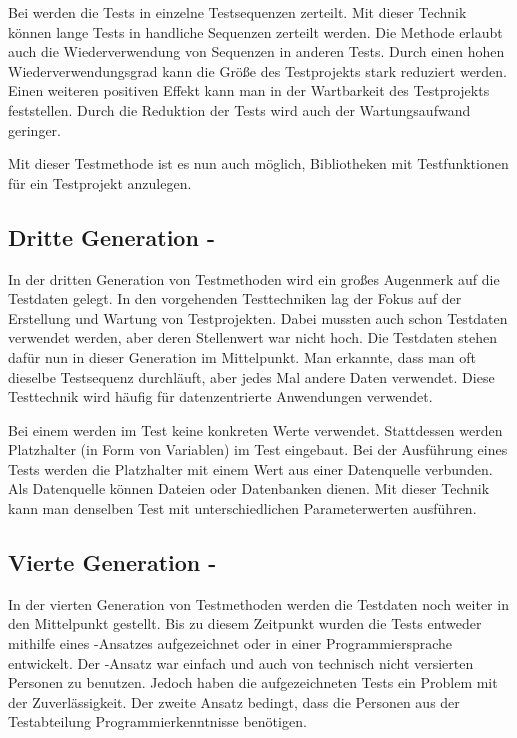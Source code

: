 Bei  werden die Tests in einzelne Testsequenzen zerteilt. Mit dieser Technik können lange Tests in handliche Sequenzen zerteilt werden. Die Methode erlaubt auch die Wiederverwendung von Sequenzen in anderen Tests. Durch einen hohen Wiederverwendungsgrad kann die Größe des Testprojekts stark reduziert werden. Einen weiteren positiven Effekt kann man in der Wartbarkeit des Testprojekts feststellen. Durch die Reduktion der Tests wird auch der Wartungsaufwand geringer.

\SuperPar
Mit dieser Testmethode ist es nun auch möglich, Bibliotheken mit Testfunktionen für ein Testprojekt anzulegen. 

\subsection{Dritte Generation - }

In der dritten Generation von Testmethoden wird ein großes Augenmerk auf die Testdaten gelegt. In den vorgehenden Testtechniken lag der Fokus auf der Erstellung und Wartung von Testprojekten. Dabei mussten auch schon Testdaten verwendet werden, aber deren Stellenwert war nicht hoch. Die Testdaten stehen dafür nun in dieser Generation im Mittelpunkt. Man erkannte, dass man oft dieselbe Testsequenz durchläuft, aber jedes Mal andere Daten verwendet. Diese Testtechnik wird häufig für datenzentrierte Anwendungen verwendet. 

\SuperPar
Bei einem  werden im Test keine konkreten Werte verwendet. Stattdessen werden Platzhalter (in Form von Variablen) im Test eingebaut. Bei der Ausführung eines Tests werden die Platzhalter mit einem Wert aus einer Datenquelle verbunden. Als Datenquelle können Dateien oder Datenbanken dienen. Mit dieser Technik kann man denselben Test mit unterschiedlichen Parameterwerten ausführen. 

\subsection{Vierte Generation - }

In der vierten Generation von Testmethoden werden die Testdaten noch weiter in den Mittelpunkt gestellt. Bis zu diesem Zeitpunkt wurden die Tests entweder mithilfe eines -Ansatzes aufgezeichnet oder in einer Programmiersprache entwickelt. Der -Ansatz war einfach und auch von technisch nicht versierten Personen zu benutzen. Jedoch haben die aufgezeichneten Tests ein Problem mit der Zuverlässigkeit. Der zweite Ansatz  bedingt, dass die Personen aus der Testabteilung Programmierkenntnisse benötigen.

